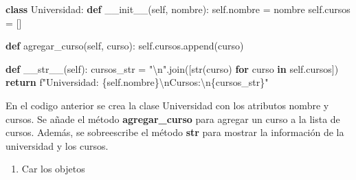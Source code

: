 \documentclass[
  a4paper,
  DIV=11,
  numbers=noendperiod,
  onepage,
  openany]{scrreprt}
\newenvironment{Shaded}{\begin{snugshade}}{\end{snugshade}}
\newcommand{\BuiltInTok}[1]{\textcolor[rgb]{0.00,0.23,0.31}{#1}}
\newcommand{\CharTok}[1]{\textcolor[rgb]{0.13,0.47,0.30}{#1}}
\newcommand{\ControlFlowTok}[1]{\textcolor[rgb]{0.00,0.23,0.31}{\textbf{#1}}}
\newcommand{\FunctionTok}[1]{\textcolor[rgb]{0.28,0.35,0.67}{#1}}
\newcommand{\KeywordTok}[1]{\textcolor[rgb]{0.00,0.23,0.31}{\textbf{#1}}}
\newcommand{\NormalTok}[1]{\textcolor[rgb]{0.00,0.23,0.31}{#1}}
\newcommand{\OperatorTok}[1]{\textcolor[rgb]{0.37,0.37,0.37}{#1}}
\newcommand{\SpecialCharTok}[1]{\textcolor[rgb]{0.37,0.37,0.37}{#1}}
\newcommand{\SpecialStringTok}[1]{\textcolor[rgb]{0.13,0.47,0.30}{#1}}
\newcommand{\StringTok}[1]{\textcolor[rgb]{0.13,0.47,0.30}{#1}}
\newcommand{\VariableTok}[1]{\textcolor[rgb]{0.07,0.07,0.07}{#1}}
\providecommand{\tightlist}{%
  \setlength{\itemsep}{0pt}\setlength{\parskip}{0pt}}\usepackage{longtable,booktabs,array}
\begin{document}
\begin{Shaded}
\begin{Highlighting}[]
\KeywordTok{class}\NormalTok{ Universidad:}
    \KeywordTok{def} \FunctionTok{\_\_init\_\_}\NormalTok{(}\VariableTok{self}\NormalTok{, nombre):}
        \VariableTok{self}\NormalTok{.nombre }\OperatorTok{=}\NormalTok{ nombre}
        \VariableTok{self}\NormalTok{.cursos }\OperatorTok{=}\NormalTok{ []}

    \KeywordTok{def}\NormalTok{ agregar\_curso(}\VariableTok{self}\NormalTok{, curso):}
        \VariableTok{self}\NormalTok{.cursos.append(curso)}

    \KeywordTok{def} \FunctionTok{\_\_str\_\_}\NormalTok{(}\VariableTok{self}\NormalTok{):}
\NormalTok{        cursos\_str }\OperatorTok{=} \StringTok{"}\CharTok{\textbackslash{}n}\StringTok{"}\NormalTok{.join([}\BuiltInTok{str}\NormalTok{(curso) }\ControlFlowTok{for}\NormalTok{ curso }\KeywordTok{in} \VariableTok{self}\NormalTok{.cursos])}
        \ControlFlowTok{return} \SpecialStringTok{f"Universidad: }\SpecialCharTok{\{}\VariableTok{self}\SpecialCharTok{.}\NormalTok{nombre}\SpecialCharTok{\}}\CharTok{\textbackslash{}n}\SpecialStringTok{Cursos:}\CharTok{\textbackslash{}n}\SpecialCharTok{\{}\NormalTok{cursos\_str}\SpecialCharTok{\}}\SpecialStringTok{"}
\end{Highlighting}
\end{Shaded}

En el codigo anterior se crea la clase Universidad con los atributos
nombre y cursos. Se añade el método \textbf{agregar\_curso} para agregar
un curso a la lista de cursos. Además, se sobreescribe el método
\textbf{\textbf{str}} para mostrar la información de la universidad y
los cursos.

\begin{enumerate}
\def\labelenumi{\arabic{enumi}.}
\setcounter{enumi}{5}
\tightlist
\item
  Car los objetos
\end{enumerate}
\end{document}
